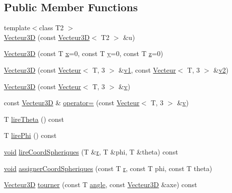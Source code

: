 \subsection*{Public Member Functions}
\begin{DoxyCompactItemize}
\item 
{\footnotesize template$<$class T2 $>$ }\\\hyperlink{class_vecteur3_d_a4e440b6497113a0898d55d9ef8b6fe98}{Vecteur3\-D} (const \hyperlink{class_vecteur3_d}{Vecteur3\-D}$<$ T2 $>$ \&u)
\item 
\hyperlink{class_vecteur3_d_a3dac3fef39e0de25b9cf4105ea4f54c1}{Vecteur3\-D} (const T \hyperlink{glew_8h_ad77deca22f617d3f0e0eb786445689fc}{x}=0, const T \hyperlink{glew_8h_a9298c7ad619074f5285b32c6b72bfdea}{y}=0, const T \hyperlink{glew_8h_a826e1ac898f4ef56cea62219f74607db}{z}=0)
\item 
\hyperlink{class_vecteur3_d_aee3fa82fca12f7c5716617997e0a07b4}{Vecteur3\-D} (const \hyperlink{class_vecteur}{Vecteur}$<$ T, 3 $>$ \&\hyperlink{glew_8h_a0779c3b73f9aa3a0ac5b0139b5d291d9}{v1}, const \hyperlink{class_vecteur}{Vecteur}$<$ T, 3 $>$ \&\hyperlink{glew_8h_a9a09a1837922b2b806f4589096a52049}{v2})
\item 
\hyperlink{class_vecteur3_d_a6f4a132eaeff0688956279fd4c194908}{Vecteur3\-D} (const \hyperlink{class_vecteur}{Vecteur}$<$ T, 3 $>$ \&\hyperlink{glew_8h_a6509431814422c215a65946289dd98b8}{v})
\item 
const \hyperlink{class_vecteur3_d}{Vecteur3\-D} \& \hyperlink{class_vecteur3_d_ae71f89b1a7176fd7c9703c7e26c8d50d}{operator=} (const \hyperlink{class_vecteur}{Vecteur}$<$ T, 3 $>$ \&\hyperlink{glew_8h_a6509431814422c215a65946289dd98b8}{v})
\item 
T \hyperlink{class_vecteur3_d_abad73b19714098f545f6dd4260f0e479}{lire\-Theta} () const 
\item 
T \hyperlink{class_vecteur3_d_addb40be5e1fef2ac222282a9a8653a1d}{lire\-Phi} () const 
\item 
\hyperlink{wglew_8h_aeea6e3dfae3acf232096f57d2d57f084}{void} \hyperlink{class_vecteur3_d_aaca3efa6e3de652ae9a5b0d068217daf}{lire\-Coord\-Spheriques} (T \&\hyperlink{glew_8h_afc1d5bdb45878ca9a9eb0b223d646b35}{r}, T \&phi, T \&theta) const 
\item 
\hyperlink{wglew_8h_aeea6e3dfae3acf232096f57d2d57f084}{void} \hyperlink{class_vecteur3_d_a7ebfed587f8295fa90dded603ffd9495}{assigner\-Coord\-Spheriques} (const T \hyperlink{glew_8h_afc1d5bdb45878ca9a9eb0b223d646b35}{r}, const T phi, const T theta)
\item 
\hyperlink{class_vecteur3_d}{Vecteur3\-D} \hyperlink{class_vecteur3_d_a5026a41f03a1b0a31158b9a29ef27177}{tourner} (const T \hyperlink{glew_8h_a6d7a98b0d979b9411a4344a98a7a6122}{angle}, const \hyperlink{class_vecteur3_d}{Vecteur3\-D} \&axe) const 
\end{DoxyCompactItemize}

